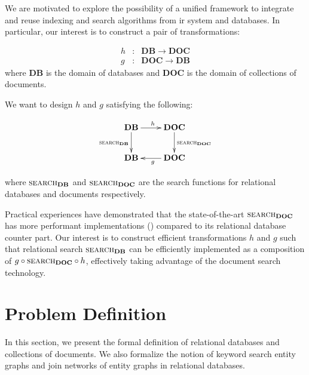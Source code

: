 \documentclass[conference]{IEEEtran}
\newcommand{\op}[1]{{\textsc{#1}}}
\newcommand{\DB}{\mathbf{DB}}
\newcommand{\DOC}{\mathbf{DOC}}
\begin{document}
We are motivated to explore the possibility of a unified framework to integrate and reuse indexing and search algorithms from \gls{ir} system and databases.  In particular, our interest is to construct a pair of transformations:

\begin{eqnarray*}
h &:& \mathbf{DB} \to \mathbf{DOC} \\
g &:& \mathbf{DOC} \to \mathbf{DB}
\end{eqnarray*}
where $\mathbf{DB}$ is the domain of databases and $\mathbf{DOC}$ is the domain of collections of documents.

We want to design $h$ and $g$ satisfying the following:

\begin{displaymath}
\xymatrix {
    \mathbf{DB} \ar[r]^h\ar[d]_{\op{search}_\mathbf{DB}} 
        & \mathbf{DOC}\ar[d]^{\op{search}_\mathbf{DOC}} \\
    \mathbf{DB} & \mathbf{DOC}\ar[l]^g
}
\end{displaymath}

where $\op{search}_\DB$ and $\op{search}_\DOC$ are the search functions for relational databases and documents respectively.

Practical experiences have demonstrated that the state-of-the-art $\op{search}_\DOC$ has more performant implementations (\cite{xapian,lucene}) compared to its relational database counter part.  Our interest is to construct efficient transformations $h$ and $g$ such that relational search $\op{search}_\DB$ can be efficiently implemented as a composition of $g\circ \op{search}_\DOC\circ h$, effectively taking advantage of the document search technology.

\section{Problem Definition}

In this section, we present the formal definition of relational databases and collections of documents.  We also formalize the notion of keyword search entity graphs and join networks of entity graphs in relational databases.

\printbibliography
\end{document}
